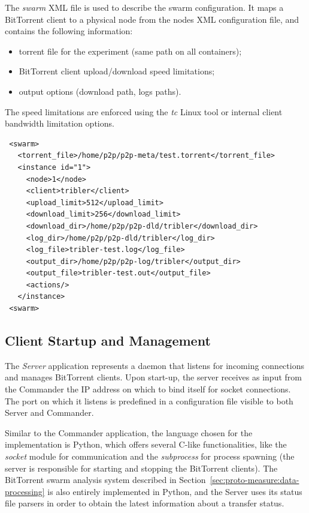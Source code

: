 The \textit{swarm} XML file is used to describe the swarm configuration. It
maps a BitTorrent client to a physical node from the nodes XML configuration
file, and contains the following information:

\begin{itemize}
  \item torrent file for the experiment (same path on all containers);
  \item BitTorrent client upload/download speed limitations;
  \item output options (download path, logs paths).
\end{itemize}

The speed limitations are enforced using the \textit{tc} Linux tool or
internal client bandwidth limitation options.

\scriptsize
\begin{verbatim}
 <swarm>
   <torrent_file>/home/p2p/p2p-meta/test.torrent</torrent_file>
   <instance id="1">
     <node>1</node>
     <client>tribler</client>
     <upload_limit>512</upload_limit>
     <download_limit>256</download_limit>
     <download_dir>/home/p2p/p2p-dld/tribler</download_dir>
     <log_dir>/home/p2p/p2p-dld/tribler</log_dir>
     <log_file>tribler-test.log</log_file>
     <output_dir>/home/p2p/p2p-log/tribler</output_dir>
     <output_file>tribler-test.out</output_file>
     <actions/>
   </instance>
 <swarm>
\end{verbatim}
\normalsize

\subsection{Client Startup and Management}
\label{sec:deploy-startup}

The \textit{Server} application represents a daemon that listens for incoming
connections and manages BitTorrent clients. Upon start-up, the server receives
as input from the Commander the IP address on which to bind itself for socket
connections. The port on which it listens is predefined in a configuration
file visible to both Server and Commander.

Similar to the Commander application, the language chosen for the
implementation is Python, which offers several C-like functionalities, like
the \textit{socket} module for communication and the \textit{subprocess} for
process spawning (the server is responsible for starting and stopping the
BitTorrent clients). The BitTorrent swarm analysis system described in
Section~\ref{sec:proto-measure:data-processing} is also entirely implemented
in Python, and the Server uses its status file parsers in order to obtain the
latest information about a transfer status.

